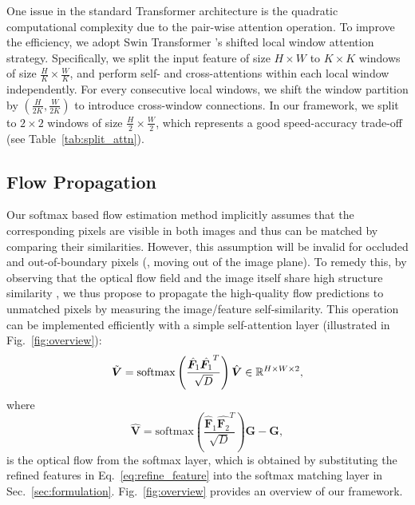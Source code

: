 \documentclass[10pt,twocolumn,letterpaper]{article}
\begin{document}
One issue in the standard Transformer architecture \cite{vaswani2017attention} is the quadratic computational complexity due to the pair-wise attention operation. To improve the efficiency, we adopt Swin Transformer \cite{liu2021Swin}'s shifted local window attention strategy. Specifically, we split the input feature of size $H \times W$ to $K \times K$ windows of size $\frac{H}{K} \times \frac{W}{K}$, and perform self- and cross-attentions within each local window independently. For every consecutive local windows, we shift the window partition by $(\frac{H}{2K}, \frac{W}{2K})$ to introduce cross-window connections. In our framework, we split to $2 \times 2$ windows of size $\frac{H}{2} \times \frac{W}{2}$, which represents a good speed-accuracy trade-off (see Table~\ref{tab:split_attn}).











\subsection{Flow Propagation}
Our softmax based flow estimation method implicitly assumes that the corresponding pixels are visible in both images and thus can be matched by comparing their similarities. However, this assumption will be invalid for occluded and out-of-boundary pixels (\ie, moving out of the image plane). To remedy this, by observing that the optical flow field and the image itself share high structure similarity \cite{Jiang_2021_ICCV}, we thus propose to propagate the high-quality flow predictions to unmatched pixels by measuring the image/feature self-similarity. This operation can be implemented efficiently with a simple self-attention layer (illustrated in Fig.~\ref{fig:overview}):
\begin{equation}
    \Tilde{\bm V} = \mathrm{softmax} \left(\frac{\hat{\bm F}_1 \hat{\bm F_1}^T}{\sqrt{D}}\right) \hat{\bm V}  \in \mathbb{R}^{H \times W \times 2},
\end{equation}
where
\begin{equation}
    \hat{\bm V} = \mathrm{softmax} \left(\frac{\hat{\bm F}_1 \hat{\bm F_2}^T}{\sqrt{D}}\right) {\bm G} - {\bm G},
\end{equation}
is the optical flow from the softmax layer, which is obtained by substituting the refined features in Eq.~\eqref{eq:refine_feature} into the softmax matching layer in Sec.~\ref{sec:formulation}. Fig.~\ref{fig:overview} provides an overview of our framework.
\end{document}
